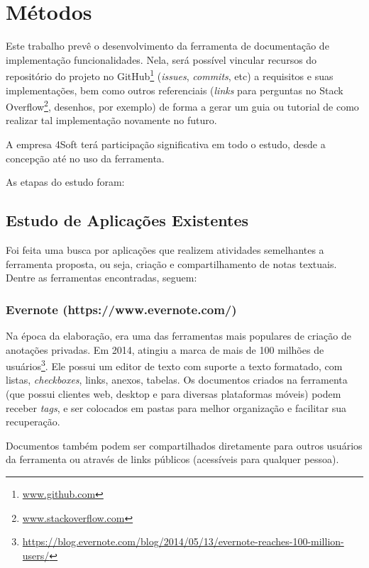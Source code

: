 \chapter{Métodos}

Este trabalho prevê o desenvolvimento da ferramenta de documentação de implementação funcionalidades. Nela, será possível vincular recursos do repositório do projeto no GitHub\footnote{\url{www.github.com}} (\textit{issues}, \textit{commits}, etc) a requisitos e suas implementações, bem como outros referenciais (\textit{links} para perguntas no Stack Overflow\footnote{\url{www.stackoverflow.com}}, desenhos, por exemplo) de forma a gerar um guia ou tutorial de como realizar tal implementação novamente no futuro.

A empresa 4Soft terá participação significativa em todo o estudo, desde a concepção até no uso da ferramenta.

As etapas do estudo foram:

\section{Estudo de Aplicações Existentes}

Foi feita uma busca por aplicações que realizem atividades semelhantes a ferramenta proposta, ou seja, criação e compartilhamento de notas textuais. Dentre as ferramentas encontradas, seguem:


\subsection{Evernote (https://www.evernote.com/)}

Na época da elaboração, era uma das ferramentas mais populares de criação de anotações privadas. Em 2014, atingiu a marca de mais de 100 milhões de usuários\footnote{\url{https://blog.evernote.com/blog/2014/05/13/evernote-reaches-100-million-users/}}. Ele possui um editor de texto com suporte a texto formatado, com listas, \textit{checkboxes}, links, anexos, tabelas. Os documentos criados na ferramenta (que possui clientes web, desktop e para diversas plataformas móveis) podem receber \textit{tags}, e ser colocados em pastas para melhor organização e facilitar sua recuperação.


Documentos também podem ser compartilhados diretamente para outros usuários da ferramenta ou através de links públicos (acessíveis para qualquer pessoa).

